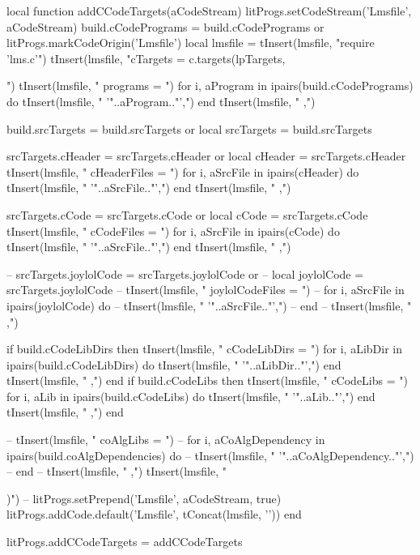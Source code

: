 local function addCCodeTargets(aCodeStream)
  litProgs.setCodeStream('Lmsfile', aCodeStream)
  build.cCodePrograms = build.cCodePrograms or { }
  litProgs.markCodeOrigin('Lmsfile')
  local lmsfile = {}
  tInsert(lmsfile, "require 'lms.c'\n")
  tInsert(lmsfile, "cTargets = c.targets(lpTargets, {")
  tInsert(lmsfile, "  programs = {")
  for i, aProgram in ipairs(build.cCodePrograms) do
    tInsert(lmsfile, "    '"..aProgram.."',")
  end
  tInsert(lmsfile, "  },")
  
  build.srcTargets = build.srcTargets or { }
  local srcTargets = build.srcTargets
  
  srcTargets.cHeader = srcTargets.cHeader or { }
  local cHeader      = srcTargets.cHeader
  tInsert(lmsfile, "  cHeaderFiles = {")
  for i, aSrcFile in ipairs(cHeader) do
    tInsert(lmsfile, "    '"..aSrcFile.."',")
  end
  tInsert(lmsfile, "  },")
  
  srcTargets.cCode = srcTargets.cCode or { }
  local cCode      = srcTargets.cCode
  tInsert(lmsfile, "  cCodeFiles = {")
  for i, aSrcFile in ipairs(cCode) do
    tInsert(lmsfile, "    '"..aSrcFile.."',")
  end
  tInsert(lmsfile, "  },")

--  srcTargets.joylolCode = srcTargets.joylolCode or { }
--  local joylolCode      = srcTargets.joylolCode
--  tInsert(lmsfile, "  joylolCodeFiles = {")
--  for i, aSrcFile in ipairs(joylolCode) do
--    tInsert(lmsfile, "    '"..aSrcFile.."',")
--  end
--  tInsert(lmsfile, "  },")

  if build.cCodeLibDirs then 
    tInsert(lmsfile, "  cCodeLibDirs = {")
    for i, aLibDir in ipairs(build.cCodeLibDirs) do
      tInsert(lmsfile, "    '"..aLibDir.."',")
    end
    tInsert(lmsfile, "  },")
  end
  if build.cCodeLibs then 
    tInsert(lmsfile, "  cCodeLibs = {")
    for i, aLib in ipairs(build.cCodeLibs) do
      tInsert(lmsfile, "    '"..aLib.."',")
    end
    tInsert(lmsfile, "  },")
  end

--  tInsert(lmsfile, "  coAlgLibs = {")
--  for i, aCoAlgDependency in ipairs(build.coAlgDependencies) do
--    tInsert(lmsfile, "    '"..aCoAlgDependency.."',")
--  end
--  tInsert(lmsfile, "  },")
  tInsert(lmsfile, "})")
--  litProgs.setPrepend('Lmsfile', aCodeStream, true)
  litProgs.addCode.default('Lmsfile', tConcat(lmsfile, '\n'))
end

litProgs.addCCodeTargets = addCCodeTargets
\stopLuaCode

\startMkIVCode
\def\compileLmsfile#1{
  \directlua{
    thirddata.literateProgs.compileLmsfile('#1')
  }
}
\stopMkIVCode

